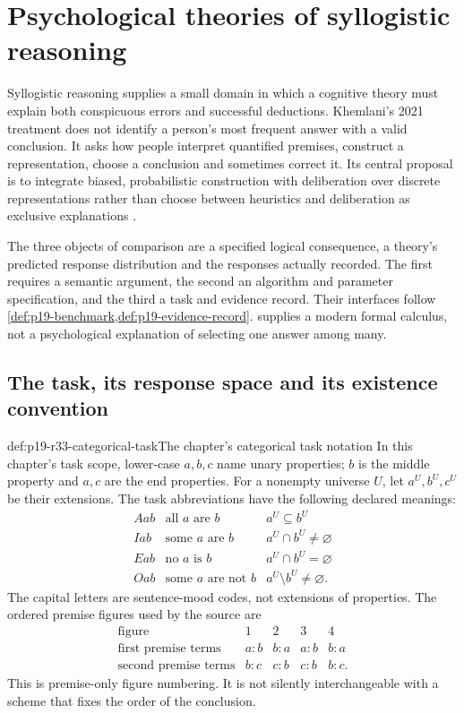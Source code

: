 \chapter{Psychological theories of syllogistic reasoning}
\label{sec:p19-rationality-3-3}

Syllogistic reasoning supplies a small domain in which a cognitive theory
must explain both conspicuous errors and successful deductions. Khemlani's
2021 treatment does not identify a person's most frequent answer with a valid
conclusion. It asks how people interpret quantified premises, construct a
representation, choose a conclusion and sometimes correct it. Its central
proposal is to integrate biased, probabilistic construction with deliberation
over discrete representations rather than choose between heuristics and
deliberation as exclusive explanations
\cite[pp.~225--236]{Khemlani2021Syllogistic}.

The three objects of comparison are a specified logical consequence, a
theory's predicted response distribution and the responses actually recorded.
The first requires a semantic argument, the second an algorithm and parameter
specification, and the third a task and evidence record. Their interfaces
follow \cref{def:p19-benchmark,def:p19-evidence-record}.
 supplies a modern formal calculus,
not a psychological explanation of selecting one answer among many.

\section{The task, its response space and its existence convention}
\label{sec:p19-r33-task}

\begin{hbdefinition}{def:p19-r33-categorical-task}{The chapter's categorical task notation}
In this chapter's task scope, lower-case \(a,b,c\) name unary properties;
\(b\) is the middle property and \(a,c\) are the end properties.
For a nonempty universe \(U\), let \(a^U,b^U,c^U\) be their extensions.
The task abbreviations have the following declared meanings:
\[
\begin{array}{c|l|l}
Aab&\text{all }a\text{ are }b&a^U\subseteq b^U\\
Iab&\text{some }a\text{ are }b&a^U\cap b^U\ne\varnothing\\
Eab&\text{no }a\text{ is }b&a^U\cap b^U=\varnothing\\
Oab&\text{some }a\text{ are not }b&a^U\setminus b^U\ne\varnothing.
\end{array}
\]
The capital letters are sentence-mood codes, not extensions of properties.
The ordered premise figures used by the source are
\[
\begin{array}{c|cccc}
\text{figure}&1&2&3&4\\
\text{first premise terms}&a\!:\!b&b\!:\!a&a\!:\!b&b\!:\!a\\
\text{second premise terms}&b\!:\!c&c\!:\!b&c\!:\!b&b\!:\!c.
\end{array}
\]
This is premise-only figure numbering. It is not silently interchangeable
with a scheme that fixes the order of the conclusion.
\end{hbdefinition}

